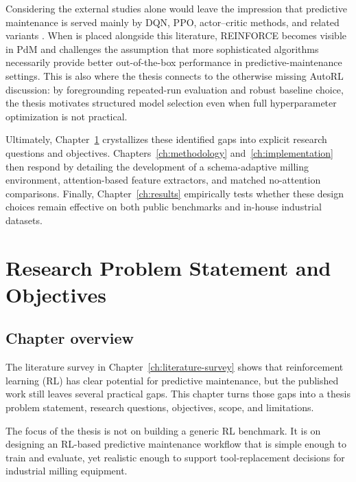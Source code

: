 \documentclass[12pt,oneside]{book}
\begin{document}
Considering the external studies alone would leave the impression that predictive maintenance is served mainly by DQN, PPO, actor--critic methods, and related variants \citep{Zha20,Ong22b,Zha23}. When \citep{Siraskar2025} is placed alongside this literature, REINFORCE becomes visible in PdM and challenges the assumption that more sophisticated algorithms necessarily provide better out-of-the-box performance in predictive-maintenance settings. This is also where the thesis connects to the otherwise missing AutoRL discussion: by foregrounding repeated-run evaluation and robust baseline choice, the thesis motivates structured model selection even when full hyperparameter optimization is not practical.

Ultimately, Chapter~\ref{ch:problem-statement} crystallizes these identified gaps into explicit research questions and objectives. Chapters~\ref{ch:methodology} and~\ref{ch:implementation} then respond by detailing the development of a schema-adaptive milling environment, attention-based feature extractors, and matched no-attention comparisons. Finally, Chapter~\ref{ch:results} empirically tests whether these design choices remain effective on both public benchmarks and in-house industrial datasets.




\chapter{Research Problem Statement and Objectives}\label{ch:problem-statement}

\section{Chapter overview}
The literature survey in Chapter~\ref{ch:literature-survey} shows that reinforcement learning (RL) has clear potential for predictive maintenance, but the published work still leaves several practical gaps. This chapter turns those gaps into a thesis problem statement, research questions, objectives, scope, and limitations.

The focus of the thesis is not on building a generic RL benchmark. It is on designing an RL-based predictive maintenance workflow that is simple enough to train and evaluate, yet realistic enough to support tool-replacement decisions for industrial milling equipment.
\end{document}
